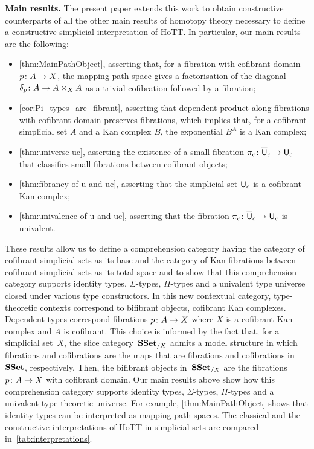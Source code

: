 \documentclass[reqno,10pt,a4paper,oneside,draft]{amsart}
\begin{document}
\noindent
\textbf{Main results.} The present paper extends this work to obtain constructive counterparts of all the other main results of 
homotopy theory necessary to define a constructive simplicial interpretation of HoTT. In particular, our main results are the following:
\begin{itemize}
\item \cref{thm:MainPathObject}, asserting that, for a fibration with cofibrant domain $p \colon A \to X$, the mapping path space 
gives a factorisation of the diagonal $\delta_p \colon A \to A \times_X A$ as a trivial cofibration followed by a fibration;
\item \cref{cor:Pi_types_are_fibrant}, asserting that dependent product along fibrations with cofibrant
domain preserves fibrations, which implies that, for a cofibrant simplicial set $A$ and a Kan complex $B$, the exponential $B^A$ is a Kan complex; 
\item \cref{thm:universe-uc}, asserting the existence of a small fibration $\pi_c \colon
\overline{\mathsf{U}}_c \to \mathsf{U}_c$ that classifies small fibrations between cofibrant objects;
\item \cref{thm:fibrancy-of-u-and-uc}, asserting that the simplicial set $\mathsf{U}_c$ is a cofibrant Kan complex;
\item \cref{thm:univalence-of-u-and-uc}, asserting that the fibration $\pi_c  \colon
\overline{\mathsf{U}}_c \to \mathsf{U}_c$ is univalent.
\end{itemize}



These results allow us to define a comprehension category having the category of cofibrant simplicial
sets as its base and the category of Kan fibrations between cofibrant simplicial sets as its total space
and to show that this comprehension category supports identity types, $\Sigma$-types, $\Pi$-types and a univalent type universe closed under various type constructors. In this new contextual category, type-theoretic
contexts correspond to bifibrant objects, \ie cofibrant Kan complexes.   Dependent types correspond fibrations $p \colon A \to X$ where $X$ is a cofibrant Kan complex and $A$ is cofibrant. This choice is informed by the fact that, for a simplicial set~$X$, the slice category~$\mathbf{SSet}_{/X}$ admits a model structure in which fibrations and cofibrations are the maps that are fibrations and cofibrations in~$\mathbf{SSet}$, respectively. Then, the bifibrant objects in~$\mathbf{SSet}_{/X}$ are the fibrations $p \colon A \to X$ with cofibrant domain. 
Our main results above show how this comprehension category 
supports identity types, 
$\Sigma$-types, $\Pi$-types and a univalent type theoretic universe.
For example, \cref{thm:MainPathObject} shows that identity types can be interpreted as 
mapping path spaces. The classical and the constructive interpretations of HoTT in simplicial sets are compared in~\cref{tab:interpretations}. 
\end{document}
